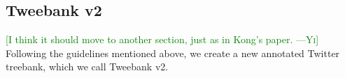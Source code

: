 \documentclass[11pt,a4paper]{article}
\newcommand{\yjcomment}[1]{\textcolor{orange}{[$_\mathrm{L}^\mathrm{Y}$#1]}}
\newcommand{\nascomment}[1]{\textcolor{blue}{[#1 ---\textsc{nas}]}}
\newcommand{\yicomment}[1]{\textcolor{green}{[#1 ---\textsc{Yi}]}}
\begin{document}


\subsection{\sc Tweebank v2}\label{sec:anno-process}
\yicomment{I think it should move to another section, just as in Kong's paper.}
Following the guidelines mentioned above, we create a new annotated Twitter treebank, which we call {\sc Tweebank v2}.
\end{document}
